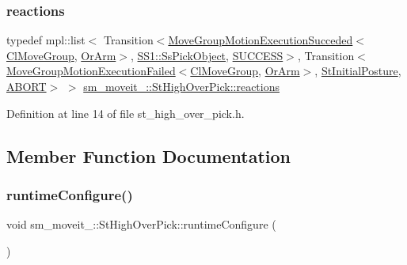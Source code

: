 \subsubsection{\texorpdfstring{reactions}{reactions}}
{\footnotesize\ttfamily typedef mpl\+::list$<$ Transition$<$\hyperlink{structmoveit__z__client_1_1MoveGroupMotionExecutionSucceded}{Move\+Group\+Motion\+Execution\+Succeded}$<$\hyperlink{classmoveit__z__client_1_1ClMoveGroup}{Cl\+Move\+Group}, \hyperlink{classsm__moveit__3_1_1OrArm}{Or\+Arm}$>$, \hyperlink{structsm__moveit__3_1_1SS1_1_1SsPickObject}{S\+S1\+::\+Ss\+Pick\+Object}, \hyperlink{classSUCCESS}{S\+U\+C\+C\+E\+SS}$>$, Transition$<$\hyperlink{structmoveit__z__client_1_1MoveGroupMotionExecutionFailed}{Move\+Group\+Motion\+Execution\+Failed}$<$\hyperlink{classmoveit__z__client_1_1ClMoveGroup}{Cl\+Move\+Group}, \hyperlink{classsm__moveit__3_1_1OrArm}{Or\+Arm}$>$, \hyperlink{structsm__moveit__3_1_1StInitialPosture}{St\+Initial\+Posture}, \hyperlink{classABORT}{A\+B\+O\+RT}$>$ $>$ \hyperlink{structsm__moveit__3_1_1StHighOverPick_a0ff9cdee9431fa286043ed34356f7ce3}{sm\+\_\+moveit\+\_\+::\+St\+High\+Over\+Pick\+::reactions}}



Definition at line 14 of file st\+\_\+high\+\_\+over\+\_\+pick.\+h.



\subsection{Member Function Documentation}
\mbox{\label{structsm__moveit__3_1_1StHighOverPick_ad1cbb7d9d2819d73850de1613b6cad9a}} 
\subsubsection{\texorpdfstring{runtime\+Configure()}{runtimeConfigure()}}
{\footnotesize\ttfamily void sm\+\_\+moveit\+\_\+::\+St\+High\+Over\+Pick\+::runtime\+Configure (\begin{DoxyParamCaption}{ }\end{DoxyParamCaption})\hspace{0.3cm}{\ttfamily [inline]}}



